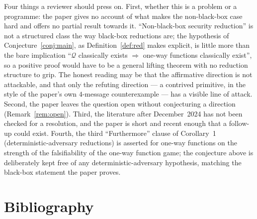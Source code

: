 \documentclass{aicr-conjecture}
\newcommand{\Qc}{\mathcal{Q}}
\begin{document}
\begin{remark}\label{rem:caveats}
Four things a reviewer should press on. First, whether this is a problem
or a programme: the paper gives no account of what makes the
non-black-box case hard and offers no partial result towards it.
``Non-black-box security reduction'' is not a structured class the way
black-box reductions are; the hypothesis of
Conjecture~\ref{conj:main}, as Definition~\ref{def:red} makes explicit,
is little more than the bare implication ``$\Qc$ classically exists
$\Rightarrow$ one-way functions classically exist'', so a positive proof
would have to be a general lifting theorem with no reduction structure to
grip. The honest reading may be that the affirmative direction is not
attackable, and that only the refuting direction --- a contrived
primitive, in the style of the paper's own $4$-message counterexample ---
has a visible line of attack. Second, the paper leaves the question open
without conjecturing a direction (Remark~\ref{rem:open}). Third, the
literature after December~2024 has not been checked for a resolution, and
the paper is short and recent enough that a follow-up could exist.
Fourth, the third ``Furthermore'' clause of Corollary~1
(deterministic-adversary reductions) is asserted for one-way functions on
the strength of the falsifiability of the one-way function game; the
conjecture above is deliberately kept free of any deterministic-adversary
hypothesis, matching the black-box statement the paper proves.
\end{remark}

\section{Bibliography}
\end{document}
